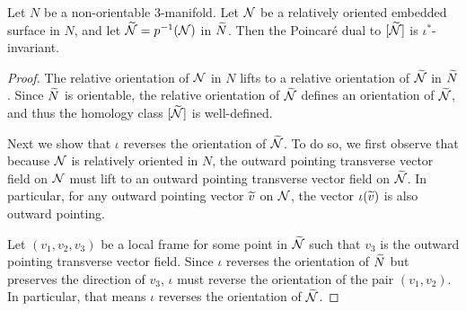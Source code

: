 \begin{lem}
  \label{lem:PD1}
 Let $N$ be a non-orientable 3-manifold.  %
  Let $\mathcal{N}$ be a relatively oriented embedded surface in $N$, and let $\widetilde{\mathcal{N}}=p^{-1}(\mathcal{N})$ in $\widetilde{N}$.
  Then the Poincar\'e dual to $[\widetilde{\mathcal{N}}]$ is $\iota^{\ast}$-invariant.%
\end{lem}
\begin{proof}
  The relative orientation of $\mathcal{N}$ in $N$ lifts to a relative orientation of $\widetilde{\mathcal{N}}$ in $\widetilde{N}$.
  Since $\widetilde{N}$ is orientable, the relative orientation of $\widetilde{\mathcal{N}}$ defines an orientation of $\widetilde{\mathcal{N}}$, and thus the homology class $[\widetilde{\mathcal{N}}]$ is well-defined.

  Next we show that $\iota$ reverses the orientation of $\widetilde{\mathcal{N}}$.  To do so, we first observe that because $\mathcal{N}$ is relatively oriented in $N$, the outward pointing transverse vector field on ${\mathcal{N}}$ must lift to an outward pointing transverse vector field on $\widetilde{\mathcal{N}}$.  In particular, for any outward pointing vector $\widetilde{v}$ on $\mathcal{N}$, the vector $\iota(\widetilde{v})$ is also outward pointing.%

  Let $(v_1, v_2, v_3)$ be a local frame for some point in $\widetilde{\mathcal{N}}$ such that
  $v_3$ is the outward pointing transverse vector field.
  Since $\iota$ reverses the orientation of $\widetilde{N}$ but preserves the direction of $v_3$, $\iota$ must reverse the orientation of the pair $(v_1, v_2)$.
  In particular, that means $\iota$ reverses the orientation of $\widetilde{\mathcal{N}}$.


\end{proof}
